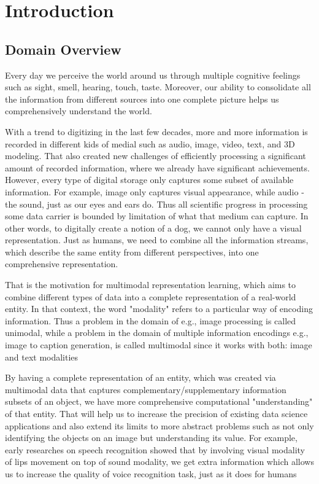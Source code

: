 \chapter{Introduction}
\section{Domain Overview}

Every day we perceive the world around us through multiple cognitive feelings such as sight, smell, hearing, touch, taste. Moreover, our ability to consolidate all the information from different sources into one complete picture helps us comprehensively understand the world.

With a trend to digitizing in the last few decades, more and more information is recorded in different kids of medial such as audio, image, video, text, and 3D modeling. That also created new challenges of efficiently processing a significant amount of recorded information, where we already have significant achievements. However, every type of digital storage only captures some subset of available information. For example, image only captures visual appearance, while  audio - the sound, just as our eyes and ears do. Thus all scientific progress in processing some data carrier is bounded by limitation of what that medium can capture. In other words, to digitally create a notion of a dog, we cannot only have a visual representation. Just as humans, we need to combine all the information streams, which describe the same entity from different perspectives, into one comprehensive representation.

That is the motivation for multimodal representation learning, which aims to combine different types of data into a complete representation of a real-world entity. In that context, the word "modality" refers to a particular way of encoding information. Thus a problem in the domain of e.g., image processing is called unimodal, while a problem in the domain of multiple information encodings e.g., image to caption generation, is called multimodal since it works with both: image and text modalities \cite{ref_survey} 

By having a complete representation of an entity, which was created via multimodal data that captures complementary/supplementary information subsets of an object, we have more comprehensive computational "understanding" of that entity. That will help us to increase the precision of existing data science applications and also extend its limits to more abstract problems such as not only identifying the objects on an image but understanding its value. For example\cite{ref_survey}, early researches on speech recognition showed that by involving visual modality of lips movement on top of sound modality, we get extra information which allows us to increase the quality of voice recognition task, just as it does for humans\cite{ref_human_voice_recognition}

